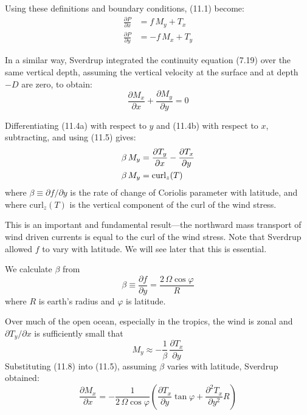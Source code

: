 Using these definitions and boundary conditions, (11.1) become:
\begin{subequations}
\begin{align}
\frac{\partial{P}}{\partial{x}} &= f\,M_y + T_x  \\
\frac{\partial{P}}{\partial{y}} &= -f\,M_x + T_y
\end{align}
\end{subequations}

In a similar way, Sverdrup integrated the continuity equation (7.19)
over the same vertical depth, assuming the vertical velocity at the
surface and at depth $-D$ are zero, to obtain:
\begin{equation}
\frac{\partial{M_x}}{\partial{x}} + \frac{\partial{M_y}}{\partial{y}} = 0
\end{equation}

Differentiating (11.4a) with respect to $y$ and (11.4b) with respect
to $x$, subtracting, and using (11.5) gives:
\begin{align}
\beta\,M_y &= \frac{\partial{T_y}}{\partial{x}} - \frac{\partial{T_x}}{\partial{y}}
\notag \\
\beta\,M_y &= \text{curl}_z(T)
\end{align}
where $\beta \equiv \partial{f}/\partial{y}$ is the rate of change of
Coriolis parameter with latitude, and where curl$_z(T)$ is the
vertical component of the curl of the wind stress.

This is an important and fundamental result---the northward mass
transport of wind driven currents is equal
to the curl of the wind stress. Note that Sverdrup allowed $f$ to vary
with latitude. We will see later that this is essential.

We calculate $\beta $ from
\begin{equation}
\beta \equiv \frac{\partial{f}}{\partial{y}} = \frac{2\,\Omega\cos\varphi}{R}
\end{equation}
where $R$ is earth's radius and $\varphi$ is latitude.

Over much of the open ocean, especially in the tropics, the wind is
zonal and $\partial{T_y}/\partial{x}$ is sufficiently small that
\begin{equation}
M_y \approx -\frac{1}{\beta}\,\frac{\partial T_x}{\partial y}
\end{equation}
Substituting (11.8) into (11.5), assuming $\beta$ varies with
latitude, Sverdrup obtained:
\begin{equation}
\frac{\partial{M_x}}{\partial{x}}=-
\frac{1}{2\,\Omega\cos\varphi}\left(\frac{\partial{T_x}}{\partial{y}}\tan\varphi +
\frac{\partial^2{T_x}}{\partial{y}^2}R \right)
\end{equation}


